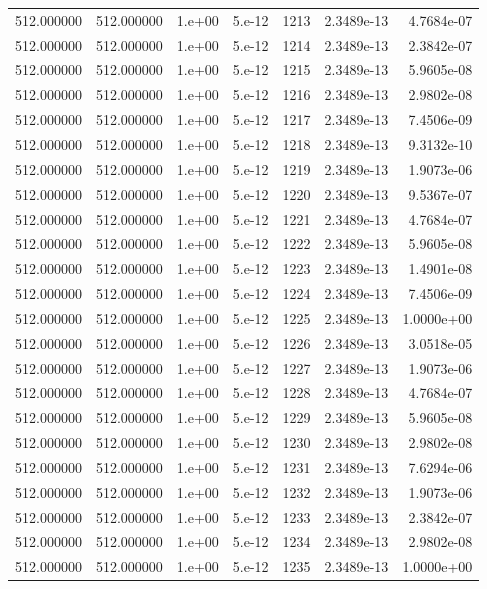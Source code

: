 \begin{table}[htbp]
\begin{tabular}{rrrrrrr}
512.000000 & 512.000000 & 1.e+00 & 5.e-12 & 1213 & 2.3489e-13 & 4.7684e-07 \\
512.000000 & 512.000000 & 1.e+00 & 5.e-12 & 1214 & 2.3489e-13 & 2.3842e-07 \\
512.000000 & 512.000000 & 1.e+00 & 5.e-12 & 1215 & 2.3489e-13 & 5.9605e-08 \\
512.000000 & 512.000000 & 1.e+00 & 5.e-12 & 1216 & 2.3489e-13 & 2.9802e-08 \\
512.000000 & 512.000000 & 1.e+00 & 5.e-12 & 1217 & 2.3489e-13 & 7.4506e-09 \\
512.000000 & 512.000000 & 1.e+00 & 5.e-12 & 1218 & 2.3489e-13 & 9.3132e-10 \\
512.000000 & 512.000000 & 1.e+00 & 5.e-12 & 1219 & 2.3489e-13 & 1.9073e-06 \\
512.000000 & 512.000000 & 1.e+00 & 5.e-12 & 1220 & 2.3489e-13 & 9.5367e-07 \\
512.000000 & 512.000000 & 1.e+00 & 5.e-12 & 1221 & 2.3489e-13 & 4.7684e-07 \\
512.000000 & 512.000000 & 1.e+00 & 5.e-12 & 1222 & 2.3489e-13 & 5.9605e-08 \\
512.000000 & 512.000000 & 1.e+00 & 5.e-12 & 1223 & 2.3489e-13 & 1.4901e-08 \\
512.000000 & 512.000000 & 1.e+00 & 5.e-12 & 1224 & 2.3489e-13 & 7.4506e-09 \\
512.000000 & 512.000000 & 1.e+00 & 5.e-12 & 1225 & 2.3489e-13 & 1.0000e+00 \\
512.000000 & 512.000000 & 1.e+00 & 5.e-12 & 1226 & 2.3489e-13 & 3.0518e-05 \\
512.000000 & 512.000000 & 1.e+00 & 5.e-12 & 1227 & 2.3489e-13 & 1.9073e-06 \\
512.000000 & 512.000000 & 1.e+00 & 5.e-12 & 1228 & 2.3489e-13 & 4.7684e-07 \\
512.000000 & 512.000000 & 1.e+00 & 5.e-12 & 1229 & 2.3489e-13 & 5.9605e-08 \\
512.000000 & 512.000000 & 1.e+00 & 5.e-12 & 1230 & 2.3489e-13 & 2.9802e-08 \\
512.000000 & 512.000000 & 1.e+00 & 5.e-12 & 1231 & 2.3489e-13 & 7.6294e-06 \\
512.000000 & 512.000000 & 1.e+00 & 5.e-12 & 1232 & 2.3489e-13 & 1.9073e-06 \\
512.000000 & 512.000000 & 1.e+00 & 5.e-12 & 1233 & 2.3489e-13 & 2.3842e-07 \\
512.000000 & 512.000000 & 1.e+00 & 5.e-12 & 1234 & 2.3489e-13 & 2.9802e-08 \\
512.000000 & 512.000000 & 1.e+00 & 5.e-12 & 1235 & 2.3489e-13 & 1.0000e+00 \\

\end{tabular}
\end{table}
